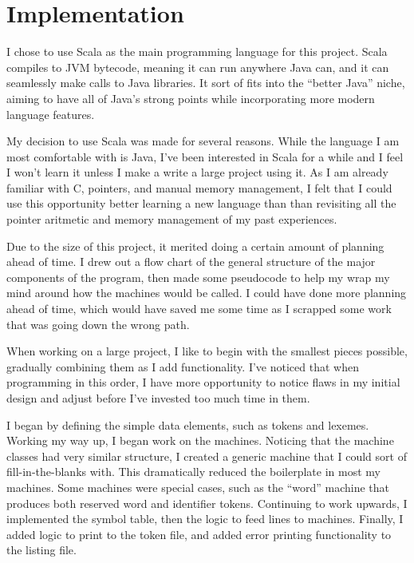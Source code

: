 \documentclass[paper=letter, fontsize=11pt, oneside, titlepage]{scrartcl}
\begin{document}
\section{Implementation}\label{impl}

I chose to use Scala as the main programming language for this project.  Scala compiles to JVM bytecode, meaning it can run anywhere Java can, and it can seamlessly make calls to Java libraries.  It sort of fits into the ``better Java'' niche, aiming to have all of Java's strong points while incorporating more modern language features.

My decision to use Scala was made for several reasons.  While the language I am most comfortable with is Java, I've been interested in Scala for a while and I feel I won't learn it unless I make a write a large project using it.  As I am already familiar with C, pointers, and manual memory management, I felt that I could use this opportunity better learning a new language than than revisiting all the pointer aritmetic and memory management of my past experiences.  

Due to the size of this project, it merited doing a certain amount of planning ahead of time.  I drew out a flow chart of the general structure of the major components of the program, then made some pseudocode to help my wrap my mind around how the machines would be called.  I could have done more planning ahead of time, which would have saved me some time as I scrapped some work that was going down the wrong path.

When working on a large project, I like to begin with the smallest pieces possible, gradually combining them as I add functionality.  I've noticed that when programming in this order, I have more opportunity to notice flaws in my initial design and adjust before I've invested too much time in them.

I began by defining the simple data elements, such as tokens and lexemes. Working my way up, I began work on the machines.  Noticing that the machine classes had very similar structure, I created a generic machine that I could sort of fill-in-the-blanks with.  This dramatically reduced the boilerplate in most my machines. Some machines were special cases, such as the ``word'' machine that produces both reserved word and identifier tokens.  Continuing to work upwards, I implemented the symbol table, then the logic to feed lines to machines.  Finally, I added logic to print to the token file, and added error printing functionality to the listing file.
\end{document}
